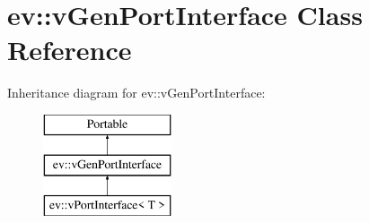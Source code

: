 \hypertarget{classev_1_1vGenPortInterface}{}\section{ev\+:\+:v\+Gen\+Port\+Interface Class Reference}
\label{classev_1_1vGenPortInterface}
Inheritance diagram for ev\+:\+:v\+Gen\+Port\+Interface\+:\begin{figure}[H]
\begin{center}
\leavevmode
\includegraphics[height=3.000000cm]{classev_1_1vGenPortInterface}
\end{center}
\end{figure}
